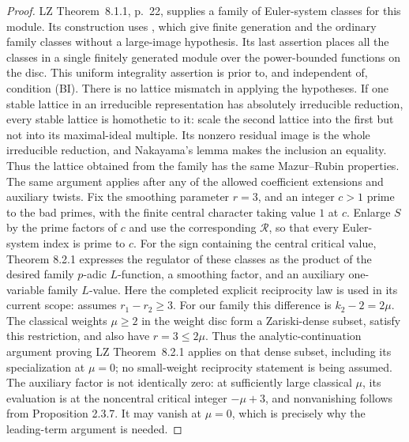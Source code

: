\begin{proof}
LZ Theorem~8.1.1, p.~22, supplies a family of Euler-system classes
for this module. Its construction uses
\citet[Theorems~2.6.2 and~7.1.1, pp.~4 and~15]{LoefflerRockwoodZerbes2024},
which give finite generation and the ordinary family classes without
a large-image hypothesis.
Its last assertion places all the classes in a single finitely generated
module over the power-bounded functions on the disc.  This uniform
integrality assertion is prior to, and independent of, condition (BI).
There is no lattice mismatch in applying the hypotheses.  If one stable
lattice in an irreducible representation has absolutely irreducible
reduction, every stable lattice is homothetic to it: scale the second
lattice into the first but not into its maximal-ideal multiple.  Its
nonzero residual image is the whole irreducible reduction, and
Nakayama's lemma makes the inclusion an equality.  Thus the lattice
obtained from the family has the same Mazur--Rubin properties.  The
same argument applies after any of the allowed coefficient extensions
and auxiliary twists.
Fix the smoothing parameter $r=3$, and an integer $c>1$ prime to the
bad primes, with the finite central character taking value $1$ at $c$.
Enlarge $S$ by the prime factors of $c$ and use the corresponding
$\mathcal R$, so that every Euler-system index is prime to $c$.
For the sign containing the central critical value, Theorem 8.2.1
expresses the regulator of these classes as the product of the desired
family $p$-adic $L$-function, a smoothing factor, and an auxiliary
one-variable family $L$-value.  Here the completed explicit reciprocity
law is used in its current scope:
\citet[Theorem~A, p.~4; Theorem~6.6.4, p.~14 of the April 2026
author version]{LoefflerZerbes2026} assumes $r_1-r_2\geq3$.  For our family this difference
is $k_2-2=2\mu$.  The classical weights $\mu\geq2$ in the weight
disc form a Zariski-dense subset, satisfy this restriction, and also
have $r=3\leq2\mu$.  Thus the analytic-continuation argument proving
LZ Theorem~8.2.1 applies on that dense subset, including its
specialization at $\mu=0$; no small-weight reciprocity statement is
being assumed.  The auxiliary factor is not identically
zero: at sufficiently large classical $\mu$, its evaluation is at the
noncentral critical integer $-\mu+3$, and nonvanishing follows from
Proposition 2.3.7.  It may vanish at $\mu=0$, which is precisely why the
leading-term argument is needed.


\end{proof}
